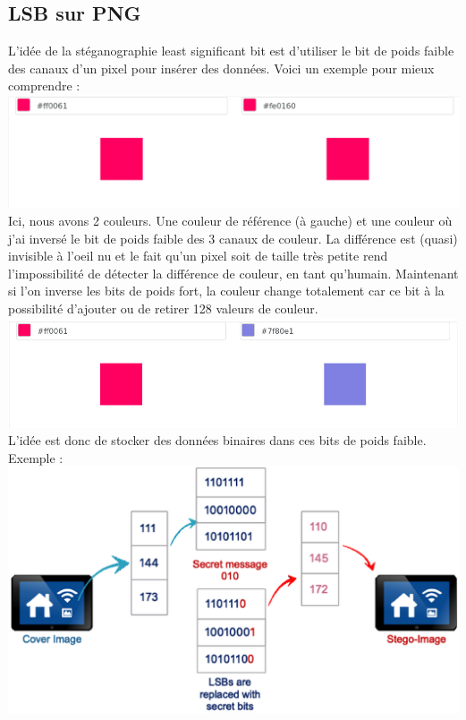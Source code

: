 \subsection{LSB sur PNG}
L'idée de la stéganographie least significant bit est d'utiliser le bit de poids faible des canaux d'un pixel pour insérer des données.
\newline
Voici un exemple pour mieux comprendre :
\newline
\includegraphics[width=1\textwidth]{img/color_comparaison.eps}
Ici, nous avons 2 couleurs. Une couleur de référence (à gauche) et une couleur où j'ai inversé le bit de poids faible des 3 canaux de couleur.
\newline
La différence est (quasi) invisible à l'oeil nu et le fait qu'un pixel soit de taille très petite rend l'impossibilité de détecter la différence de couleur, en tant qu'humain.
\newline
Maintenant si l'on inverse les bits de poids fort, la couleur change totalement car ce bit à la possibilité d'ajouter ou de retirer 128 valeurs de couleur.
\includegraphics[width=1\textwidth]{img/color_big_comparaison.png}
\newline
L'idée est donc de stocker des données binaires dans ces bits de poids faible. Exemple :
\newline
\includegraphics[width=1\textwidth]{img/LSB-image-steganography.eps}